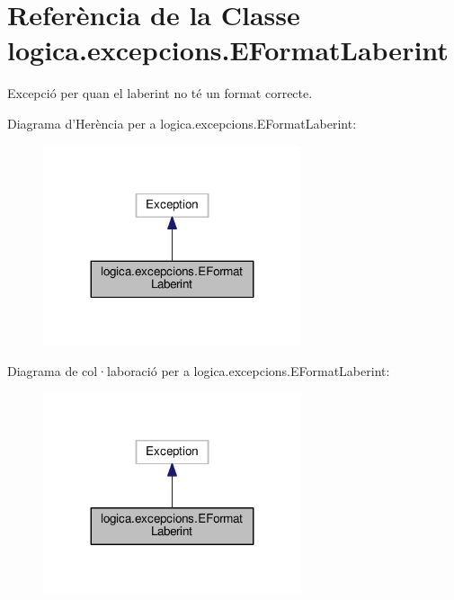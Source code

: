 \hypertarget{classlogica_1_1excepcions_1_1_e_format_laberint}{\section{Referència de la Classe logica.\+excepcions.\+E\+Format\+Laberint}
\label{classlogica_1_1excepcions_1_1_e_format_laberint}
}


Excepció per quan el laberint no té un format correcte.  




Diagrama d'Herència per a logica.\+excepcions.\+E\+Format\+Laberint\+:
\nopagebreak
\begin{figure}[H]
\begin{center}
\leavevmode
\includegraphics[width=215pt]{classlogica_1_1excepcions_1_1_e_format_laberint__inherit__graph}
\end{center}
\end{figure}


Diagrama de col·laboració per a logica.\+excepcions.\+E\+Format\+Laberint\+:
\nopagebreak
\begin{figure}[H]
\begin{center}
\leavevmode
\includegraphics[width=215pt]{classlogica_1_1excepcions_1_1_e_format_laberint__coll__graph}
\end{center}
\end{figure}
